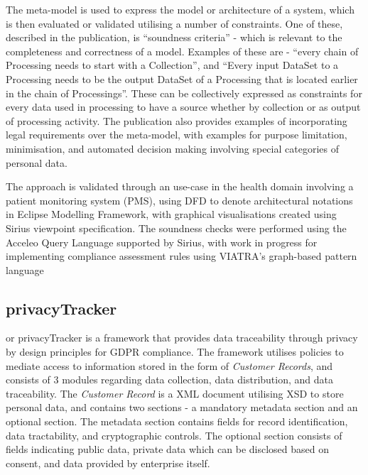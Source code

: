 The meta-model is used to express the model or architecture of a system, which is then evaluated or validated utilising a number of constraints. One of these, described in the publication, is ``soundness criteria'' - which is relevant to the completeness and correctness of a model. Examples of these are - ``every chain of Processing needs to start with a Collection'', and ``Every input DataSet to a Processing needs to be the output DataSet of a Processing that is located earlier in the chain of Processings''. These can be collectively expressed as constraints for every data used in processing to have a source whether by collection or as output of processing activity. The publication also provides examples of incorporating legal requirements over the meta-model, with examples for purpose limitation, minimisation, and automated decision making involving special categories of personal data. 

The approach is validated through an use-case in the health domain involving a patient monitoring system (PMS), using DFD to denote architectural notations in Eclipse Modelling Framework, with graphical visualisations created using Sirius viewpoint specification. The soundness checks were performed using the Acceleo Query Language supported by Sirius, with work in progress for implementing compliance assessment rules using VIATRA’s graph-based pattern language

\subsection{privacyTracker}
or privacyTracker \cite{gjermundrod_privacytracker:_2016} is a framework that provides data traceability through privacy by design principles for GDPR compliance. The framework utilises policies to mediate access to information stored in the form of \textit{Customer Records}, and consists of 3 modules regarding data collection, data distribution, and data traceability. The \textit{Customer Record} is a XML document utilising XSD to store personal data, and contains two sections - a mandatory metadata section and an optional section. The metadata section contains fields for record identification, data tractability, and cryptographic controls. The optional section consists of fields indicating public data, private data which can be disclosed based on consent, and data provided by enterprise itself.

